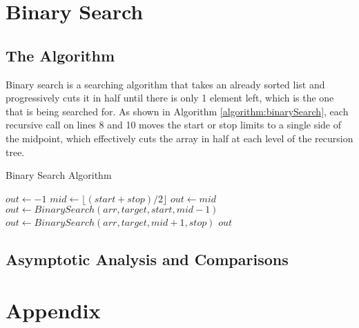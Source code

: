 \documentclass[letterpaper, 10pt,DIV=13]{scrartcl}
\numberwithin{equation}{section} %
\numberwithin{figure}{section} %
\numberwithin{table}{section} %
\begin{document}
\section{Binary Search}
\subsection{The Algorithm}\label{binarySearch}
Binary search is a searching algorithm that takes an already sorted list and progressively cuts it in half until there is only 1 element left, which is the one that is being searched for. As shown in Algorithm \ref{algorithm:binarySearch}, each recursive call on lines 8 and 10 moves the start or stop limits to a single side of the midpoint, which effectively cuts the array in half at each level of the recursion tree.

\begin{algorithm}
  \caption{Binary Search Algorithm}
  \label{algorithm:binarySearch}
  \begin{algorithmic}[1]
        \State $out \gets -1$ 
         
          \State $mid \gets \lfloor(start + stop) / 2\rfloor$ 
            \State $out \gets mid$ 
           
            \State $out \gets BinarySearch(arr, target, start, mid - 1)$ 
          \Else {}
            \State $out \gets BinarySearch(arr, target, mid + 1, stop)$ 
          \EndIf
        \EndIf
        \State \Return $out$
      \EndProcedure
  \end{algorithmic}
\end{algorithm}

\subsection{Asymptotic Analysis and Comparisons}

\section{Appendix}
\end{document}
